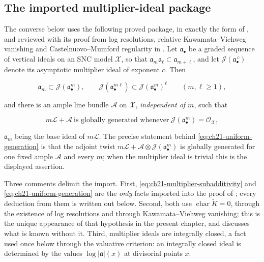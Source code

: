 \subsection{The imported multiplier-ideal package}
\label{sec:ch21-multiplier-input}

The converse below uses the following proved package, in exactly the form of
\cite[Appendix~B]{BFJ16}, and reviewed with its proof from log resolutions,
relative Kawamata--Viehweg vanishing and Castelnuovo--Mumford regularity in
.  Let \(\mathfrak a_\bullet\) be a
graded sequence of vertical ideals on an SNC model \(\mathcal X\), so that
\(\mathfrak a_m\mathfrak a_\ell\subset\mathfrak a_{m+\ell}\), and let
\(\mathcal J(\mathfrak a_\bullet^{\,c})\) denote its asymptotic multiplier
ideal of exponent \(c\).  Then

\begin{equation}
\label{eq:ch21-multiplier-subadditivity}
 \mathfrak a_m\subset
 \mathcal J(\mathfrak a_\bullet^m),
 \qquad
 \mathcal J(\mathfrak a_\bullet^{m\ell})
 \subset\mathcal J(\mathfrak a_\bullet^m)^\ell
 \qquad(m,\ell\geq1),
\end{equation}

and there is an ample line bundle \(\mathcal A\) on \(\mathcal X\),
\emph{independent of \(m\)}, such that

\begin{equation}
\label{eq:ch21-uniform-generation}
 m\mathcal L+\mathcal A\ \text{is globally generated whenever}\
 \mathcal J(\mathfrak a_\bullet^m)=\mathcal O_{\mathcal X},
\end{equation}

\(\mathfrak a_m\) being the base ideal of \(m\mathcal L\).  The precise
statement behind \eqref{eq:ch21-uniform-generation} is that the adjoint
twist \(m\mathcal L+\mathcal A\otimes\mathcal J(\mathfrak a_\bullet^m)\) is
globally generated for one fixed ample \(\mathcal A\) and every \(m\); when
the multiplier ideal is trivial this is the displayed assertion.

Three comments delimit the import.  First,
\eqref{eq:ch21-multiplier-subadditivity} and
\eqref{eq:ch21-uniform-generation} are the \emph{only} facts imported into
the proof of \Cref{thm:ch21-model-consistency}; every deduction from them is
written out below.  Second, both use
\(\operatorname{char}\widetilde K=0\), through the existence of log
resolutions and through Kawamata--Viehweg vanishing; this is the unique
appearance of that hypothesis in the present chapter, and
 discusses what is known without it.  Third,
multiplier ideals are integrally closed, a fact used once below through the
valuative criterion: an integrally closed ideal is determined by the values
\(\log|\mathfrak a|(x)\) at divisorial points \(x\).

